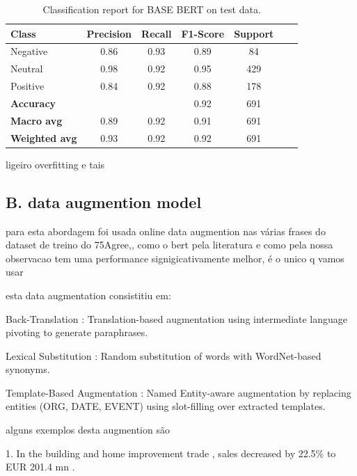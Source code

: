 \documentclass[conference]{IEEEtran}
\begin{document}
\begin{table}[H]
\centering
\caption{Classification report for BASE BERT on test data.}
\label{cr_basebert_test}
\begin{tabular}{lcccccc}
\toprule
\textbf{Class} & \textbf{Precision} & \textbf{Recall} & \textbf{F1-Score} & \textbf{Support} \\
\midrule
Negative & 0.86 & 0.93 & 0.89 & 84 \\
Neutral & 0.98 & 0.92 & 0.95 & 429 \\
Positive & 0.84 & 0.92 & 0.88 & 178 \\
\midrule
\textbf{Accuracy} &  &  & 0.92 & 691 \\
\textbf{Macro avg} & 0.89 & 0.92 & 0.91 & 691 \\
\textbf{Weighted avg} & 0.93 & 0.92 & 0.92 & 691 \\
\bottomrule
\end{tabular}
\end{table}

ligeiro overfitting e tais

\subsection{B. data augmention model}

para esta abordagem foi usada online data augmention nas várias frases do dataset de treino do 75Agree,, como o bert pela literatura e como pela nossa observacao tem uma performance signigicativamente melhor, é o unico q vamos usar

esta data augmentation consistitiu em:

Back-Translation : Translation-based augmentation using intermediate language pivoting to generate paraphrases.


Lexical Substitution : Random substitution of words with WordNet-based synonyms.


Template-Based Augmentation : Named Entity-aware augmentation by replacing entities (ORG, DATE, EVENT) using slot-filling over extracted templates.


alguns exemplos desta augmention são

1. In the building and home improvement trade , sales decreased by 22.5\% to EUR 201.4 mn .
\end{document}
